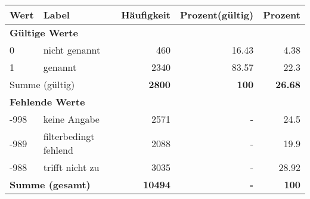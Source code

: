      \begin{longtable}{lXrrr}
     \toprule
     \textbf{Wert} & \textbf{Label} & \textbf{Häufigkeit} & \textbf{Prozent(gültig)} & \textbf{Prozent} \\
     \endhead
     \midrule
     \multicolumn{5}{l}{\textbf{Gültige Werte}}\\

     0 &
     \multicolumn{1}{X}{ nicht genannt   } &


       \num{460} &
       \num[round-mode=places,round-precision=2]{16,43} &
         \num[round-mode=places,round-precision=2]{4,38} \\

     1 &
     \multicolumn{1}{X}{ genannt   } &


       \num{2340} &
       \num[round-mode=places,round-precision=2]{83,57} &
         \num[round-mode=places,round-precision=2]{22,3} \\
     \midrule
     \multicolumn{2}{l}{Summe (gültig)} &
       \textbf{\num{2800}} &
     \textbf{100} &
       \textbf{\num[round-mode=places,round-precision=2]{26,68}} \\
     \multicolumn{5}{l}{\textbf{Fehlende Werte}}\\
       -998 &
       keine Angabe &
         \num{2571} &
        - &
         \num[round-mode=places,round-precision=2]{24,5} \\
       -989 &
       filterbedingt fehlend &
         \num{2088} &
        - &
         \num[round-mode=places,round-precision=2]{19,9} \\
       -988 &
       trifft nicht zu &
         \num{3035} &
        - &
         \num[round-mode=places,round-precision=2]{28,92} \\
     \midrule
     \multicolumn{2}{l}{\textbf{Summe (gesamt)}} &
          \textbf{\num{10494}} &
        \textbf{-} &
        \textbf{100} \\
     \bottomrule
     \end{longtable}
     
